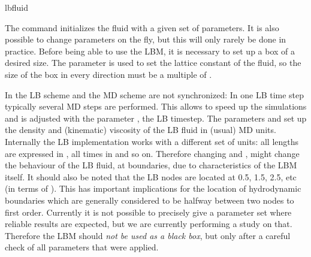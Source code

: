 \begin{essyntax}
  lbfluid
  \begin{features}
  \end{features}
\end{essyntax}
The  command initializes the fluid with a given
set of parameters. It is also possible to change parameters on the
fly, but this will only rarely be done in practice. Before being able
to use the LBM, it is necessary to set up a box of a desired size. The
parameter  is used to set the lattice constant of the
fluid, so the size of the box in every direction must be a multiple of
.

In \es the LB scheme and the MD scheme are not synchronized: In one LB
time step typically several MD steps are performed. This allows to
speed up the simulations and is adjusted with the parameter ,
the LB timestep.
The parameters  and  set up the density and
(kinematic) viscosity of the LB fluid in (usual) MD units.  Internally the LB
implementation works with a different set of units: all lengths are
expressed in , all times in  and so on.  Therefore
changing  and , might change the behaviour of the
LB fluid, \eg at boundaries, due to characteristics of the LBM
itself. It should also be noted that the LB nodes are located at 0.5, 1.5, 2.5,
etc (in terms of ).  This has important implications for the
location of hydrodynamic boundaries which are generally considered
to be halfway between two nodes to first order.
Currently it is not possible to precisely give a parameter set
where reliable results are expected, but we are currently performing a
study on that. Therefore the LBM should \emph{not be used as a black
  box}, but only after a careful check of all parameters that were
applied. 

